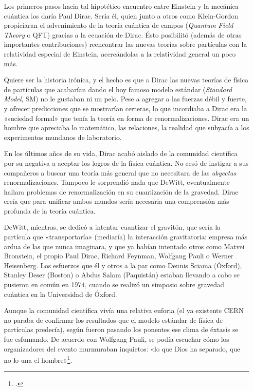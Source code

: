 \documentclass[11pt,a4paper,titlepage]{article}
\begin{document}
Los primeros pasos hacia tal hipotético encuentro entre Einstein y la mecánica cuántica los daría Paul Dirac. Sería él, quien junto a otros como Klein-Gordon propiciaran el advenimiento de la teoría cuántica de campos (\textit{Quantum Field Theory} o QFT) gracias a la ecuación de Dirac. Ésto posibilitó (además de otras importantes contribuciones) reencontrar las nuevas teorías sobre partículas con la relatividad especial de Einstein, acercándolas a la relatividad general un poco más.

Quiere ser la historia irónica, y el hecho es que a Dirac las nuevas teorías de física de partículas que acabarían dando el hoy famoso modelo estándar (\textit{Standard Model}, SM) no le gustaban ni un pelo. Pese a agregar a las fuerzas débil y fuerte, y ofrecer predicciones que se mostrarían certeras, lo que incordiaba a Dirac era la «suciedad formal» que tenía la teoría en forma de renormalizaciones. Dirac era un hombre que apreciaba lo matemático, las relaciones, la realidad que subyacía a los experimentos mundanos de laboratorio.

En los últimos años de su vida, Dirac acabó aislado de la comunidad científica por su negativa a aceptar los logros de la física cuántica. No cesó de instigar a sus compañeros a buscar una teoría más general que no necesitara de las \textit{abyectas} renormalizaciones. Tampoco le sorprendió nada que DeWitt, eventualmente hallara problemas de renormalización en su cuantización de la gravedad. Dirac creía que para unificar ambos mundos sería necesaria una comprensión más profunda de la teoría cuántica.

DeWitt, mientras, se dedicó a intentar cuantizar el gravitón, que sería la partícula que «transportaría» (mediaría) la interacción gravitatoria: empresa más ardua de las que nunca imaginara, y que ya habían intentado otros como Matvei Bronstein, el propio Paul Dirac, Richard Feynman, Wolfgang Pauli o Werner Heisenberg. Los esfuerzos que él y otros a la par como Dennis Sciama (Óxford), Stanley Deser (Boston) o Abdus Salam (Paquistán) estaban llevando a cabo se pusieron en común en 1974, cuando se realizó un simposio sobre gravedad cuántica en la Universidad de Óxford.

Aunque la comunidad científica vivía una relativa euforia (el ya existente CERN no paraba de confirmar los resultados que el modelo estándar de física de partículas predecía), según fueron pasando los ponentes ese clima de éxtasis se fue esfumando. De acuerdo con Wolfgang Pauli, se podía escuchar cómo los organizadores del evento murmuraban inquietos: «lo que Dios ha separado, que no lo una el hombre»\footnote{\cite[p.~242]{teoriaperfecta}.}.
\end{document}
